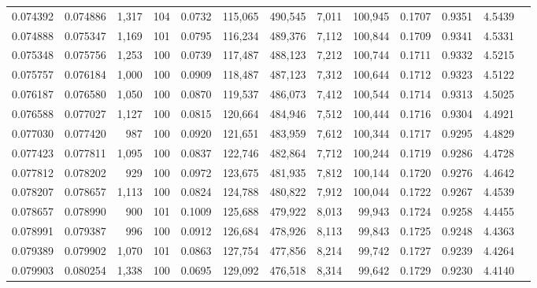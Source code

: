 \begin{tabular}{rrrrrrrrrrrrr}
0.074392 & 0.074886 & 1,317 & 104 &                                     0.0732 & 115,065 & 490,545 &   7,011 & 100,945 & 0.1707 & 0.9351 & 4.5439 \\
0.074888 & 0.075347 & 1,169 & 101 &                                     0.0795 & 116,234 & 489,376 &   7,112 & 100,844 & 0.1709 & 0.9341 & 4.5331 \\
0.075348 & 0.075756 & 1,253 & 100 &                                     0.0739 & 117,487 & 488,123 &   7,212 & 100,744 & 0.1711 & 0.9332 & 4.5215 \\
0.075757 & 0.076184 & 1,000 & 100 &                                     0.0909 & 118,487 & 487,123 &   7,312 & 100,644 & 0.1712 & 0.9323 & 4.5122 \\
0.076187 & 0.076580 & 1,050 & 100 &                                     0.0870 & 119,537 & 486,073 &   7,412 & 100,544 & 0.1714 & 0.9313 & 4.5025 \\
0.076588 & 0.077027 & 1,127 & 100 &                                     0.0815 & 120,664 & 484,946 &   7,512 & 100,444 & 0.1716 & 0.9304 & 4.4921 \\
0.077030 & 0.077420 &   987 & 100 &                                     0.0920 & 121,651 & 483,959 &   7,612 & 100,344 & 0.1717 & 0.9295 & 4.4829 \\
0.077423 & 0.077811 & 1,095 & 100 &                                     0.0837 & 122,746 & 482,864 &   7,712 & 100,244 & 0.1719 & 0.9286 & 4.4728 \\
0.077812 & 0.078202 &   929 & 100 &                                     0.0972 & 123,675 & 481,935 &   7,812 & 100,144 & 0.1720 & 0.9276 & 4.4642 \\
0.078207 & 0.078657 & 1,113 & 100 &                                     0.0824 & 124,788 & 480,822 &   7,912 & 100,044 & 0.1722 & 0.9267 & 4.4539 \\
0.078657 & 0.078990 &   900 & 101 &                                     0.1009 & 125,688 & 479,922 &   8,013 &  99,943 & 0.1724 & 0.9258 & 4.4455 \\
0.078991 & 0.079387 &   996 & 100 &                                     0.0912 & 126,684 & 478,926 &   8,113 &  99,843 & 0.1725 & 0.9248 & 4.4363 \\
0.079389 & 0.079902 & 1,070 & 101 &                                     0.0863 & 127,754 & 477,856 &   8,214 &  99,742 & 0.1727 & 0.9239 & 4.4264 \\
0.079903 & 0.080254 & 1,338 & 100 &                                     0.0695 & 129,092 & 476,518 &   8,314 &  99,642 & 0.1729 & 0.9230 & 4.4140 \\

\end{tabular}
